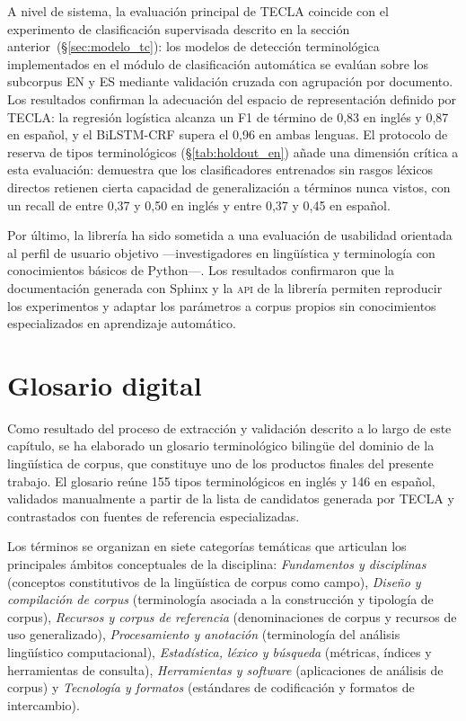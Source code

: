 A nivel de sistema, la evaluación principal de TECLA coincide con el experimento de clasificación supervisada descrito en la sección anterior~(\S\ref{sec:modelo_tc}): los modelos de detección terminológica implementados en el módulo de clasificación automática se evalúan sobre los subcorpus EN y ES mediante validación cruzada con agrupación por documento. Los resultados confirman la adecuación del espacio de representación definido por TECLA: la regresión logística alcanza un F1 de término de 0,83 en inglés y 0,87 en español, y el BiLSTM-CRF supera el 0,96 en ambas lenguas. El protocolo de reserva de tipos terminológicos (\S\ref{tab:holdout_en}) añade una dimensión crítica a esta evaluación: demuestra que los clasificadores entrenados sin rasgos léxicos directos retienen cierta capacidad de generalización a términos nunca vistos, con un recall de entre 0,37 y 0,50 en inglés y entre 0,37 y 0,45 en español.

Por último, la librería ha sido sometida a una evaluación de usabilidad orientada al perfil de usuario objetivo ---investigadores en lingüística y terminología con conocimientos básicos de Python---. Los resultados confirmaron que la documentación generada con Sphinx y la \textsc{api} de la librería permiten reproducir los experimentos y adaptar los parámetros a corpus propios sin conocimientos especializados en aprendizaje automático.

\section{Glosario digital}
\label{sec:glosario}

Como resultado del proceso de extracción y validación descrito a lo largo de este capítulo, se ha elaborado un glosario terminológico bilingüe del dominio de la lingüística de corpus, que constituye uno de los productos finales del presente trabajo. El glosario reúne 155 tipos terminológicos en inglés y 146 en español, validados manualmente a partir de la lista de candidatos generada por TECLA y contrastados con fuentes de referencia especializadas.

Los términos se organizan en siete categorías temáticas que articulan los principales ámbitos conceptuales de la disciplina: \textit{Fundamentos y disciplinas} (conceptos constitutivos de la lingüística de corpus como campo), \textit{Diseño y compilación de corpus} (terminología asociada a la construcción y tipología de corpus), \textit{Recursos y corpus de referencia} (denominaciones de corpus y recursos de uso generalizado), \textit{Procesamiento y anotación} (terminología del análisis lingüístico computacional), \textit{Estadística, léxico y búsqueda} (métricas, índices y herramientas de consulta), \textit{Herramientas y software} (aplicaciones de análisis de corpus) y \textit{Tecnología y formatos} (estándares de codificación y formatos de intercambio).

